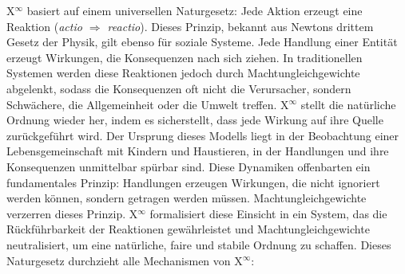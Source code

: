 \documentclass[12pt]{scrartcl}
\begin{document}
X$^\infty$ basiert auf einem universellen Naturgesetz: Jede Aktion erzeugt eine Reaktion (\emph{actio $\Rightarrow$ reactio}). Dieses Prinzip, bekannt aus Newtons drittem Gesetz der Physik, gilt ebenso für soziale Systeme. Jede Handlung einer Entität erzeugt Wirkungen, die Konsequenzen nach sich ziehen. In traditionellen Systemen werden diese Reaktionen jedoch durch Machtungleichgewichte abgelenkt, sodass die Konsequenzen oft nicht die Verursacher, sondern Schwächere, die Allgemeinheit oder die Umwelt treffen. X$^\infty$ stellt die natürliche Ordnung wieder her, indem es sicherstellt, dass jede Wirkung auf ihre Quelle zurückgeführt wird. Der Ursprung dieses Modells liegt in der Beobachtung einer Lebensgemeinschaft mit Kindern und Haustieren, in der Handlungen und ihre Konsequenzen unmittelbar spürbar sind. Diese Dynamiken offenbarten ein fundamentales Prinzip: Handlungen erzeugen Wirkungen, die nicht ignoriert werden können, sondern getragen werden müssen. Machtungleichgewichte verzerren dieses Prinzip. X$^\infty$ formalisiert diese Einsicht in ein System, das die Rückführbarkeit der Reaktionen gewährleistet und Machtungleichgewichte neutralisiert, um eine natürliche, faire und stabile Ordnung zu schaffen. Dieses Naturgesetz durchzieht alle Mechanismen von X$^\infty$:
\end{document}
